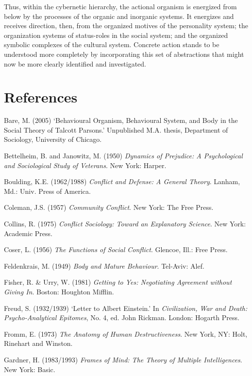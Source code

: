 Thus, within the cybernetic hierarchy, the actional organism is energized from below by the processes of the organic and inorganic systems. It energizes and receives direction, then, from the organized motives of the personality system; the organization systems of status-roles in the social system; and the organized symbolic complexes of the cultural system. Concrete action stands to be understood more completely by incorporating this set of abstractions that might now be more clearly identified and investigated.

\section*{References}

\begin{list}{}{}
\item Bare, M. (2005) `Behavioural Organism, Behavioural System, and Body in the Social Theory of Talcott Parsons.' Unpublished M.A. thesis, Department of Sociology, University of Chicago.
\item Bettelheim, B. and Janowitz, M. (1950) \emph{Dynamics of Prejudice: A Psychological and Sociological Study of Veterans}. New York: Harper.
\item Boulding, K.E. (1962/1988) \emph{Conflict and Defense: A General Theory}. Lanham, Md.: Univ. Press of America.
\item Coleman, J.S. (1957) \emph{Community Conflict}. New York: The Free Press.
\item Collins, R. (1975) \emph{Conflict Sociology: Toward an Explanatory Science}. New York: Academic Press.
\item Coser, L. (1956) \emph{The Functions of Social Conflict}. Glencoe, Ill.: Free Press.
\item Feldenkrais, M. (1949) \emph{Body and Mature Behaviour}. Tel-Aviv: Alef.
\item Fisher, R. \& Urry, W. (1981) \emph{Getting to Yes: Negotiating Agreement without Giving In}. Boston: Houghton Mifflin.
\item Freud, S. (1932/1939) `Letter to Albert Einstein.' In \emph{Civilization, War and Death: Psycho-Analytical Epitomes}, No. 4, ed. John Rickman. London: Hogarth Press.
\item Fromm, E. (1973) \emph{The Anatomy of Human Destructiveness}. New York, NY: Holt, Rinehart and Winston.
\item Gardner, H. (1983/1993) \emph{Frames of Mind: The Theory of Multiple Intelligences}. New York: Basic.

\end{list}
